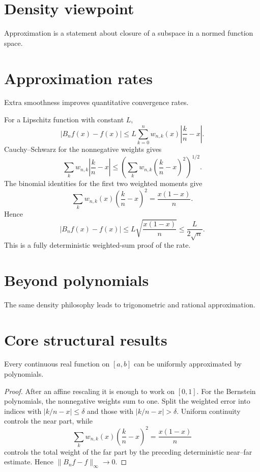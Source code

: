 \section{Density viewpoint}
Approximation is a statement about closure of a subspace in a normed function space.

\section{Approximation rates}
Extra smoothness improves quantitative convergence rates.


\begin{example}\label{ex:ii21-expand-03}
For a Lipschitz function with constant $L$,
\[
|B_nf(x)-f(x)|
\le L\sum_{k=0}^n w_{n,k}(x)\left|\frac{k}{n}-x\right|.
\]
Cauchy--Schwarz for the nonnegative weights gives
\[
\sum_k w_{n,k}\left|\frac{k}{n}-x\right|
\le\left(\sum_k w_{n,k}\left(\frac{k}{n}-x\right)^2\right)^{1/2}.
\]
The binomial identities for the first two weighted moments give
\[
\sum_k w_{n,k}(x)\left(\frac{k}{n}-x\right)^2=\frac{x(1-x)}{n}.
\]
Hence
\[
|B_nf(x)-f(x)|\le L\sqrt{\frac{x(1-x)}{n}}\le\frac{L}{2\sqrt n}.
\]
This is a fully deterministic weighted-sum proof of the rate.
\end{example}
\section{Beyond polynomials}
The same density philosophy leads to trigonometric and rational approximation.

\section{Core structural results}

\begin{theorem}\label{thm:ii21-01}
Every continuous real function on $[a,b]$ can be uniformly approximated by polynomials.
\begin{proof}
After an affine rescaling it is enough to work on $[0,1]$. For the Bernstein
polynomials, the nonnegative weights sum to one. Split the weighted error into
indices with $|k/n-x|\le\delta$ and those with $|k/n-x|>\delta$. Uniform
continuity controls the near part, while
\[
\sum_k w_{n,k}(x)\left(\frac{k}{n}-x\right)^2
=\frac{x(1-x)}{n}
\]
controls the total weight of the far part by the preceding deterministic
near--far estimate. Hence $\|B_nf-f\|_\infty\to0$.
\end{proof}
\end{theorem}

